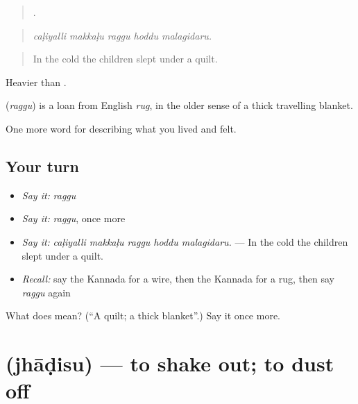\begin{quote}
    .
\end{quote}

\begin{quote}
\emph{caḷiyalli makkaḷu raggu hoddu malagidaru.}
\end{quote}

\begin{quote}
In the cold the children slept under a quilt.
\end{quote}

Heavier than .

\begin{cousinweb}
\textbf{} (\emph{raggu}) is a loan from English \emph{rug}, in the older sense of a thick travelling blanket.
\end{cousinweb}

\begin{grammarlens}[title={What you've built}]
One more word for describing what you lived and felt.
\end{grammarlens}

\subsection*{Your turn}
\begin{itemize}
\raggedright
  \item \emph{Say it:} \emph{raggu}
  \item \emph{Say it:} \emph{raggu}, once more
  \item \emph{Say it:} \emph{caḷiyalli makkaḷu raggu hoddu malagidaru.} — In the cold the children slept under a quilt.
  \item \emph{Recall:} say the Kannada for a wire, then the Kannada for a rug, then say \emph{raggu} again
\end{itemize}

\begin{tcolorbox}[breakable,colback=teal!4,colframe=teal!35!black,title={Before you move on}]
What does  mean? (\textquotedblleft{}A quilt; a thick blanket\textquotedblright{}.) Say it once more.
\end{tcolorbox}
\section[\texorpdfstring{\kn{ಝಾಡಿಸು} (jhāḍisu)}{ಝಾಡಿಸು (jhāḍisu)}]{ (jhāḍisu) — to shake out; to dust off}

